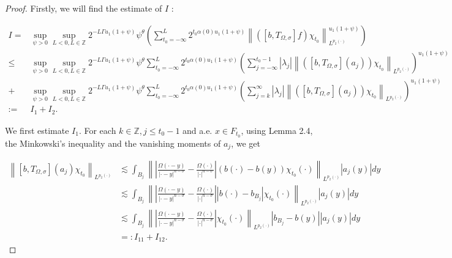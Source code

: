 \documentclass[oneside,reqno]{amsart}
\numberwithin{equation}{section}
\theoremstyle{definition}
\begin{document}
\begin{proof}
Firstly, we will find the  estimate of $I$ :

\begin{align*}
    I=&\sup_{\psi>0}\sup _{L <  0, L \in \mathbb{Z}} 2^{-L \Gamma u_1(1+\psi)} \psi^\theta \left(\sum_{t_0=-\infty}^{L} 2^{t_0\alpha (0) u_1(1+\psi)}\left\|\left( \left[b, T_{\Omega, \sigma}\right] f\right) \chi_{t_0}\right\|_{L^{p_2(\cdot)}}^{u_1(1+\psi)}\right)\\
    \leq & \sup_{\psi>0}\sup _{L <  0, L \in \mathbb{Z}} 2^{-L \Gamma u_1(1+\psi)} \psi^\theta \sum_{t_0=-\infty}^{L} 2^{t_0\alpha (0) u_1(1+\psi)}\left(\sum\limits_{j=-\infty}^{t_0-1} \left| \lambda_j\right|\left\|\left( \left[b, T_{\Omega, \sigma}\right](a_j) \right) \chi_{t_0}\right\|_{L^{p_2(\cdot)}}\right)^{u_1(1+\psi)}\\
    + & \sup_{\psi>0}\sup _{L <  0, L \in \mathbb{Z}} 2^{-L \Gamma u_1(1+\psi)} \psi^\theta \sum_{t_0=-\infty}^{L} 2^{t_0\alpha (0) u_1(1+\psi)}\left(\sum\limits_{j=k}^{\infty} \left| \lambda_j\right|\left\|\left( \left[b, T_{\Omega, \sigma}\right](a_j) \right) \chi_{t_0}\right\|_{L^{p_2(\cdot)}}\right)^{u_1(1+\psi)}\\
    :=& I_1+I_2. 
\end{align*}







We first estimate $I_{1}$. For each $k \in \mathbb{Z}, j \leq t_0-1$ and a.e. $x \in F_{t_0}$, using Lemma 2.4, the Minkowski's inequality and the vanishing moments of $a_{j}$, we get

$$
\begin{aligned}
\left\|\left[b, T_{\Omega, \sigma}\right]\left(a_{j}\right) \chi_{t_0}\right\|_{L^{p_{2}(\cdot)}} & \lesssim\int_{B_{j}}\left\|\left|\frac{\Omega(\cdot-y)}{|\cdot-y|^{n-\sigma}}-\frac{\Omega(\cdot)}{|\cdot|^ {n- \sigma}}\right|(b(\cdot)-b(y)) \chi_{t_0}(\cdot)\right\|_{L^{p_{2}(\cdot)}}\left|a_{j}(y)\right| d y \\
& \lesssim \int_{B_{j}}\left\|\left|\frac{\Omega(\cdot-y)}{|\cdot-y|^{n-\sigma}}-\frac{\Omega(\cdot)}{|\cdot|^{n-\sigma}}\right|\left|b(\cdot)-b_{B_{j}}\right| \chi_{t_0}(\cdot)\right\|_{L^{p_{2}(\cdot)}}\left|a_{j}(y)\right| d y \\
& \lesssim \int_{B_{j}}\left\|\left|\frac{\Omega(\cdot-y)}{|\cdot-y|^{n-\sigma}}-\frac{\Omega(\cdot)}{|\cdot|^{n-\sigma}}\right| \chi_{t_0}(\cdot)\right\|_{L^{p_{2}(\cdot)}}\left|b_{B_{j}}-b(y)\right|\left|a_{j}(y)\right| d y \\
& =: I_{11}+I_{12}. 
\end{aligned}
$$


\end{proof}
\end{document}
